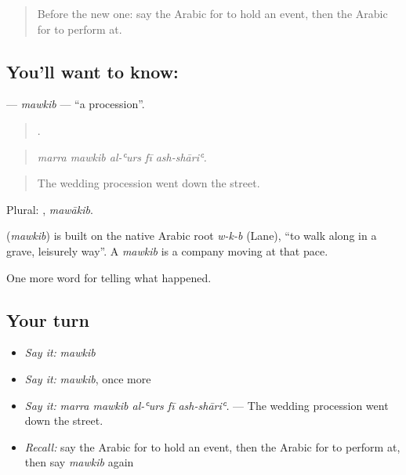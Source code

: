\label{lesson:AR-C328-mawkib}



\begin{quote}
Before the new one: say the Arabic for to hold an event, then the Arabic for to perform at.
\end{quote}

\subsection*{You'll want to know: }
\textbf{} — \emph{mawkib} — \textquotedblleft{}a procession\textquotedblright{}.

\begin{quote}
    .
\end{quote}

\begin{quote}
\emph{marra mawkib al-ʿurs fī ash-shāriʿ.}
\end{quote}

\begin{quote}
The wedding procession went down the street.
\end{quote}

Plural: , \emph{mawākib}.

\begin{cousinweb}
\textbf{} (\emph{mawkib}) is built on the native Arabic root \emph{w-k-b} (Lane), \textquotedblleft{}to walk along in a grave, leisurely way\textquotedblright{}. A \emph{mawkib} is a company moving at that pace.
\end{cousinweb}

\begin{grammarlens}[title={What you've built}]
One more word for telling what happened.
\end{grammarlens}

\subsection*{Your turn}
\begin{itemize}
\raggedright
  \item \emph{Say it:} \emph{mawkib}
  \item \emph{Say it:} \emph{mawkib}, once more
  \item \emph{Say it:} \emph{marra mawkib al-ʿurs fī ash-shāriʿ.} — The wedding procession went down the street.
  \item \emph{Recall:} say the Arabic for to hold an event, then the Arabic for to perform at, then say \emph{mawkib} again
\end{itemize}

